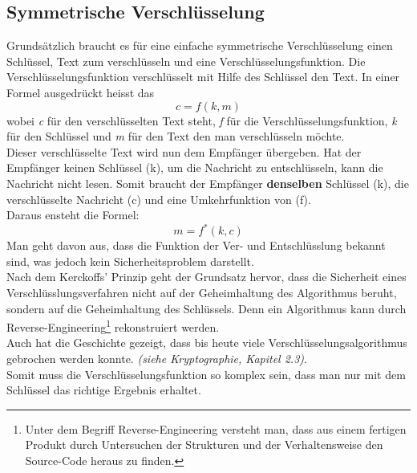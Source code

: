 \subsection{Symmetrische Verschlüsselung}
Grundsätzlich braucht es für eine einfache symmetrische Verschlüsselung einen Schlüssel, Text zum verschlüsseln und eine Verschlüsselungsfunktion.
Die Verschlüsselungsfunktion verschlüsselt mit Hilfe des Schlüssel den Text. In einer Formel ausgedrückt heisst das
\begin{equation*}
  c = f ( k, m )
\label{eqn:sym_versch}
\end{equation*}
wobei \textit{c} für den verschlüsselten Text steht, \textit{f} für die Verschlüsselungsfunktion, \textit{k} für den Schlüssel und \textit{m} für den Text den man verschlüsseln möchte.\\
%
Dieser verschlüsselte Text wird nun dem Empfänger übergeben. Hat der Empfänger keinen Schlüssel (k), um die Nachricht zu entschlüsseln, kann die Nachricht nicht lesen. Somit braucht der Empfänger \textbf{denselben} Schlüssel (k), die verschlüsselte Nachricht (c) und eine Umkehrfunktion von (f).\\
Daraus ensteht die Formel:
\begin{equation*}
  m = f^*(k ,c)
\label{eqn:sym_entsch}
\end{equation*}
Man geht davon aus, dass die Funktion der Ver- und Entschlüsslung bekannt sind, was jedoch kein Sicherheitsproblem darstellt.\\
Nach dem Kerckoffs' Prinzip geht der Grundsatz hervor, dass die Sicherheit eines Verschlüsslungsverfahren nicht auf der Geheimhaltung des Algorithmus beruht, sondern auf die Geheimhaltung des Schlüssels.
Denn ein Algorithmus kann durch Reverse-Engineering\footnote{Unter dem Begriff Reverse-Engineering versteht man, dass aus einem fertigen Produkt durch Untersuchen der Strukturen und der Verhaltensweise den Source-Code heraus zu finden.} rekonstruiert werden.\\
Auch hat die Geschichte gezeigt, dass bis heute viele Verschlüsselungsalgorithmus gebrochen werden konnte. \textit{(siehe Kryptographie, Kapitel 2.3)}.\\
%
Somit muss die Verschlüsselungsfunktion so komplex sein, dass man nur mit dem Schlüssel das richtige Ergebnis erhaltet.
%
